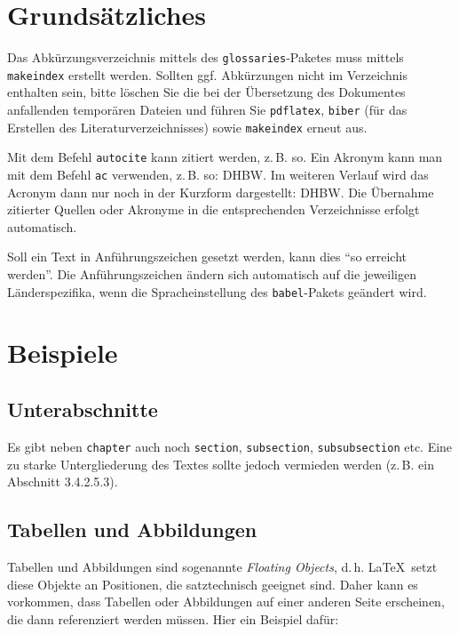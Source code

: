\section{Grundsätzliches}

Das Abkürzungsverzeichnis mittels des \texttt{glossaries}-Paketes muss mittels \texttt{makeindex} erstellt werden. Sollten ggf. Abkürzungen nicht im Verzeichnis enthalten sein,
bitte löschen Sie die bei der Übersetzung des Dokumentes anfallenden temporären Dateien und führen Sie \texttt{pdflatex}, \texttt{biber} (für das Erstellen des Literaturverzeichnisses) sowie \texttt{makeindex} erneut aus.

Mit dem Befehl \texttt{autocite} kann zitiert werden, z.\,B. so\autocite[Vgl.][S. 18ff.]{ME12}.
Ein Akronym kann man mit dem Befehl \texttt{ac} verwenden, z.\,B. so: \ac{DHBW}. Im weiteren Verlauf wird das 
Acronym dann nur noch in der Kurzform dargestellt: \ac{DHBW}. Die Übernahme zitierter Quellen oder Akronyme in die 
entsprechenden Verzeichnisse erfolgt automatisch. 

Soll ein Text in Anführungszeichen gesetzt werden, kann dies  \enquote{so erreicht werden}. Die Anführungszeichen ändern sich automatisch auf die 
jeweiligen Länderspezifika, wenn die Spracheinstellung des \texttt{babel}-Pakets geändert wird.




\section{Beispiele}
\lipsum[1]

\subsection{Unterabschnitte}
Es gibt neben \texttt{chapter} auch noch  \texttt{section}, \texttt{subsection}, \texttt{subsubsection} etc. Eine zu starke Untergliederung des Textes sollte jedoch vermieden werden (z.\,B. ein Abschnitt 3.4.2.5.3). 

\subsection{Tabellen und Abbildungen}
Tabellen und Abbildungen sind sogenannte \textit{Floating Objects}, d.\,h. \LaTeX\ setzt diese Objekte an Positionen, die satztechnisch geeignet sind. Daher kann es vorkommen, dass Tabellen oder Abbildungen auf einer anderen Seite erscheinen, die dann referenziert werden müssen. Hier ein Beispiel dafür: 

